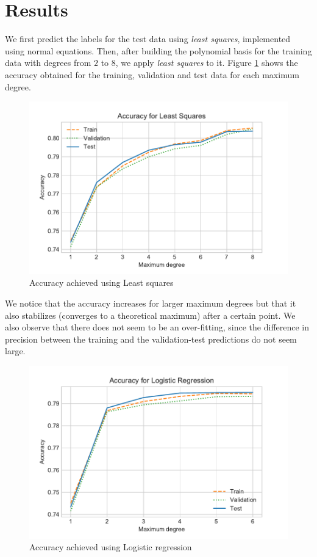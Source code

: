 \documentclass[10pt,conference,compsocconf]{IEEEtran}
\begin{document}
\section{Results}
\label{sec:results}
    We first predict the labels for the test data using \textit{least squares}, implemented using normal equations. Then, after building the polynomial basis for the training data with degrees from $2$ to $8$, we apply \textit{least squares} to it. Figure \ref{fig:LSprec} shows the accuracy obtained for the training, validation and test data for each maximum degree.

    \begin{figure}[htp]
      \centering
      \includegraphics[width=.45\textwidth,trim={0 .3cm 0 .7cm},clip]{LSprec}
      \caption{Accuracy achieved using Least squares}
      \label{fig:LSprec}
    \end{figure}


    We notice that the accuracy increases for larger maximum degrees but that it also  stabilizes (converges to a theoretical maximum) after a certain point. We also observe that there does not seem to be an over-fitting, since the difference in precision between the training and the validation-test predictions do not seem large.

    \begin{figure}[htp]
      \centering
      \includegraphics[width=.45\textwidth,trim={0 .3cm 0 .7cm},clip]{LRprec}
      \caption{Accuracy achieved using Logistic regression}
      \label{fig:LRprec}
    \end{figure}
\end{document}
